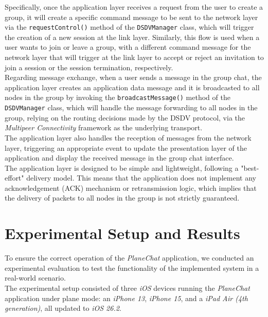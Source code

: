 \documentclass[conference]{IEEEtran}
\begin{document}
Specifically, once the application layer receives a request from the user to
create a group, it will create a specific command message to be sent to the
network layer via the \texttt{requestControl()} method of the
\texttt{DSDVManager} class, which will trigger the creation of a new session at
the link layer. Similarly, this flow is used when a user wants to join or leave
a group, with a different command message for the network layer that will
trigger at the link layer to accept or reject an invitation to join a session or 
the session termination, respectively. \\ 

Regarding message exchange, when a user sends a message in the group chat, the
application layer creates an application data message and it is broadcasted to
all nodes in the group by invoking the \texttt{broadcastMessage()} method of the
\texttt{DSDVManager} class, which will handle the message forwarding to all
nodes in the group, relying on the routing decisions made by the DSDV protocol, 
via the \textit{Multipeer Connectivity} framework as the underlying transport.\\
The application layer also handles the reception of messages from the network
layer, triggering an appropriate event to update the presentation layer of the
application and display the received message in the group chat interface. \\

The application layer is designed to be simple and lightweight, following a
"best-effort" delivery model. This means that the application does not implement
any acknowledgement (ACK) mechanism or retransmission logic, which implies that
the delivery of packets to all nodes in the group is not strictly guaranteed.

\section{Experimental Setup and Results}
\label{sec:ExperimentalSetupAndResults}
To ensure the correct operation of the \textit{PlaneChat} application, we
conducted an experimental evaluation to test the functionality of the
implemented system in a real-world scenario. \\

The experimental setup consisted of three \textit{iOS} devices running the
\textit{PlaneChat} application under plane mode: an \textit{iPhone 13},
\textit{iPhone 15}, and a \textit{iPad Air (4th generation)}, all updated to
\textit{iOS 26.2}. \\ 
\end{document}
